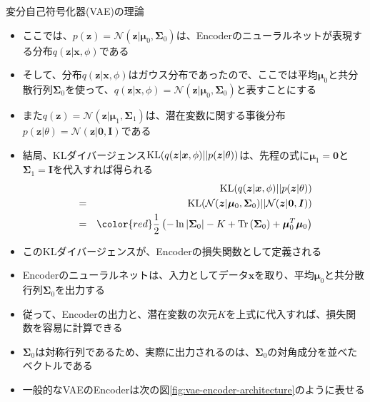 \documentclass[dvipdfmx,notheorems,t]{beamer}
\begin{document}
\begin{frame}{変分自己符号化器(VAE)の理論}
\begin{itemize}
\begin{itemize}
		\item ここでは、$p(\bm{z}) = \mathcal{N}(\bm{z} | \bm{\mu}_0, \bm{\Sigma}_0)$は、Encoderのニューラルネットが表現する分布$q(\bm{z} | \bm{x}, \phi)$である
		\item そして、分布$q(\bm{z} | \bm{x}, \phi)$はガウス分布であったので、ここでは平均$\bm{\mu}_0$と共分散行列$\bm{\Sigma}_0$を使って、$q(\bm{z} | \bm{x}, \phi) = \mathcal{N}(\bm{z} | \bm{\mu}_0, \bm{\Sigma}_0)$と表すことにする
		\newline
		
		\item また$q(\bm{z}) = \mathcal{N}(\bm{z} | \bm{\mu}_1, \bm{\Sigma}_1)$は、潜在変数に関する事後分布$p(\bm{z} | \theta) = \mathcal{N}(\bm{z} | \bm{0}, \bm{I})$である
		\newline
		
		\item 結局、KLダイバージェンス$\operatorname{KL}(q(\bm{z} | \bm{x}, \phi) || p(\bm{z} | \theta))$は、先程の式に$\bm{\mu}_1 = \bm{0}$と$\bm{\Sigma}_1 = \bm{I}$を代入すれば得られる
		\begin{eqnarray}
			&& \KL(q(\bm{z} | \bm{x}, \phi) || p(\bm{z} | \theta)) \nonumber \\
			&=& \KL(\mathcal{N}(\bm{z} | \bm{\mu}_0, \bm{\Sigma}_0) || \mathcal{N}(\bm{z} | \bm{0}, \bm{I})) \nonumber \\
			&=& \color{red}\frac{1}{2} \left( -\ln |\bm{\Sigma}_0| - K + \Tr \left( \bm{\Sigma}_0 \right) + \bm{\mu}_0^T \bm{\mu}_0 \right)\normalcolor
		\end{eqnarray}
		
		\item このKLダイバージェンスが、Encoderの損失関数として定義される
		\newline
		\item Encoderのニューラルネットは、入力としてデータ$\bm{x}$を取り、平均$\bm{\mu}_0$と共分散行列$\bm{\Sigma}_0$を出力する
		\item 従って、Encoderの出力と、潜在変数の次元$K$を上式に代入すれば、損失関数を容易に計算できる
		\newline
		\item $\bm{\Sigma}_0$は\alert{対称行列}であるため、実際に出力されるのは、\color{red}$\bm{\Sigma}_0$の対角成分を並べたベクトル\normalcolor である
		\newline
		\item 一般的なVAEのEncoderは次の図\ref{fig:vae-encoder-architecture}のように表せる
	\end{itemize}
\end{itemize}

\end{frame}
\end{document}

